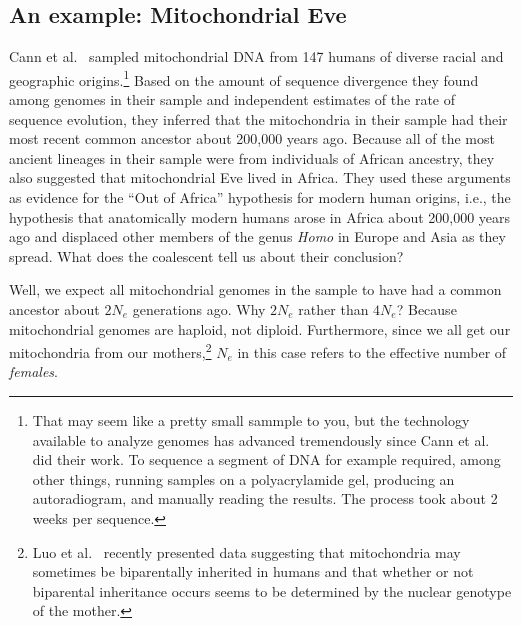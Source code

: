 \documentclass[12pt]{article}
\begin{document}
\subsection*{An example: Mitochondrial
  Eve}

Cann et al.~\cite{Cann-etal-1987} sampled mitochondrial DNA from 147
humans of diverse racial and geographic origins.\footnote{That may
  seem like a pretty small sammple to you, but the technology
  available to analyze genomes has advanced tremendously since Cann et
  al. did their work. To sequence a segment of DNA for example
  required, among other things, running samples on a polyacrylamide
  gel, producing an autoradiogram, and manually reading the
  results. The process took about 2 weeks per sequence.}  Based on the
amount of sequence divergence they found among genomes in their sample
and independent estimates of the rate of sequence evolution, they
inferred that the mitochondria in their sample had their most recent
common ancestor about 200,000 years ago. Because all of the most
ancient lineages in their sample were from individuals of African
ancestry, they also suggested that mitochondrial Eve lived in
Africa. They used these arguments as evidence for the ``Out of
Africa'' hypothesis for modern human origins, i.e., the hypothesis
that anatomically modern humans arose in Africa about 200,000 years
ago and displaced other members of the genus {\it Homo\/} in Europe
and Asia as they spread. What does the coalescent tell us about their
conclusion?

Well, we expect all mitochondrial genomes in the sample to have had a
common ancestor about $2N_e$ generations ago. Why $2N_e$ rather than
$4N_e$? Because mitochondrial genomes are haploid, not
diploid. Furthermore, since we all get our mitochondria from our
mothers,\footnote{Luo et al.~\cite{Luo-etal-2018} recently presented
  data suggesting that mitochondria may sometimes be biparentally
  inherited in humans and that whether or not biparental inheritance
  occurs seems to be determined by the nuclear genotype of the
  mother.} $N_e$ in this case refers to the effective number of {\it
  females}.
\end{document}
